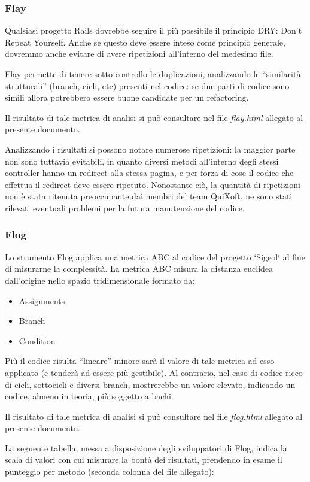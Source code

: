 \documentclass[11pt,a4paper]{article}
\begin{document}
\subsubsection{Flay}
Qualsiasi progetto Rails dovrebbe seguire il più possibile il principio DRY: Don't Repeat Yourself.
Anche se questo deve essere inteso come principio generale, dovremmo anche evitare di avere ripetizioni all’interno del medesimo file.

Flay permette di tenere sotto controllo le duplicazioni, analizzando le “similarità strutturali” (branch, cicli, etc) presenti nel codice: se due parti di codice sono simili allora potrebbero essere buone candidate per un refactoring.

Il risultato di tale metrica di analisi si può consultare nel file \textit{flay.html} allegato al presente documento.

Analizzando i risultati si possono notare numerose ripetizioni: la maggior parte non sono tuttavia evitabili, in quanto diversi metodi all'interno degli stessi controller hanno un redirect alla stessa pagina, e per forza di cose il codice che effettua il redirect deve essere ripetuto.
Nonostante ciò, la quantità di ripetizioni non è stata ritenuta preoccupante dai membri del team QuiXoft, ne sono stati rilevati eventuali problemi per la futura manutenzione del codice.
\subsubsection{Flog}
Lo strumento Flog applica una metrica ABC al codice del progetto `Sigeol` al fine di misurarne la complessità.
La metrica ABC misura la distanza euclidea dall’origine nello spazio tridimensionale formato da:
\begin{itemize}
 \item Assignments
 \item Branch
 \item Condition
\end{itemize}
Più il codice risulta “lineare” minore sarà il valore di tale metrica ad esso applicato (e tenderà ad essere più gestibile). Al contrario, nel caso di codice ricco di cicli, sottocicli e diversi branch, mostrerebbe un valore elevato, indicando un codice, almeno in teoria, più soggetto a bachi.

Il risultato di tale metrica di analisi si può consultare nel file \textit{flog.html} allegato al presente documento.

La seguente tabella, messa a disposizione degli sviluppatori di Flog, indica la scala di valori con cui misurare la bontà dei risultati, prendendo in esame il punteggio per metodo (seconda colonna del file allegato):
\end{document}
